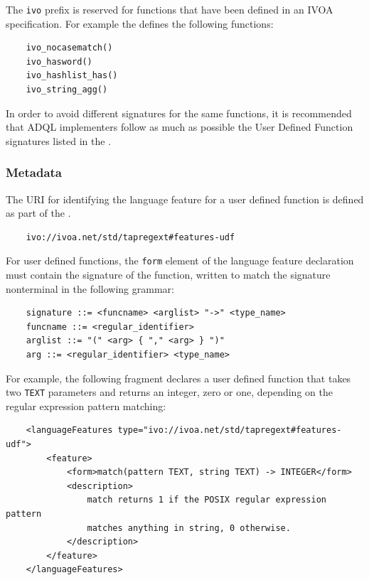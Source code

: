 \documentclass[11pt,a4paper]{ivoa}
\begin{document}
The \verb:ivo: prefix is reserved for functions that have been defined
in an IVOA specification. For example the \RegTAPSpec{} defines the following
functions:
\begin{verbatim}
    ivo_nocasematch()
    ivo_hasword()
    ivo_hashlist_has()
    ivo_string_agg()
\end{verbatim}

In order to avoid different signatures for the same functions, it is recommended
that ADQL implementers follow as much as possible the User Defined Function
signatures listed in the \CatalogueUDF{}.


\subsubsection{Metadata}
\label{sec:user.metadata}

The URI for identifying the language feature for a user defined function
is defined as part of the \TAPRegSpec{}.

\begin{verbatim}
    ivo://ivoa.net/std/tapregext#features-udf
\end{verbatim}

For user defined functions, the \verb:form: element of the language feature
declaration must contain the signature of the function, written to match
the signature nonterminal in the following grammar:
\begin{verbatim}
    signature ::= <funcname> <arglist> "->" <type_name>
    funcname ::= <regular_identifier>
    arglist ::= "(" <arg> { "," <arg> } ")"
    arg ::= <regular_identifier> <type_name>
\end{verbatim}

For example, the following fragment declares a user defined function that
takes two \verb:TEXT: parameters and returns an integer, zero or one,
depending on the regular expression pattern matching:
\begin{verbatim}
    <languageFeatures type="ivo://ivoa.net/std/tapregext#features-udf">
        <feature>
            <form>match(pattern TEXT, string TEXT) -> INTEGER</form>
            <description>
                match returns 1 if the POSIX regular expression pattern
                matches anything in string, 0 otherwise.
            </description>
        </feature>
    </languageFeatures>
\end{verbatim}
\end{document}
